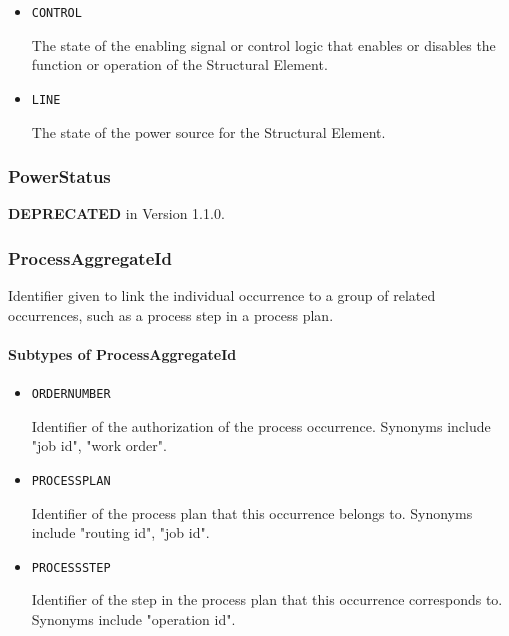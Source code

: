 \begin{itemize}

\item \texttt{CONTROL}


The state of the enabling signal or control logic that enables or disables the function or operation of the \gls{Structural Element}.

\item \texttt{LINE}


The state of the power source for the \gls{Structural Element}.


\end{itemize}

\subsubsection{PowerStatus}
\label{sec:PowerStatus}



\textbf{DEPRECATED} in Version 1.1.0.


\subsubsection{ProcessAggregateId}
\label{sec:ProcessAggregateId}



Identifier given to link the individual occurrence to a group of related occurrences, such as a process step in a process plan.


\paragraph{Subtypes of ProcessAggregateId}\mbox{}
\label{sec:Subtypes of ProcessAggregateId}

\begin{itemize}

\item \texttt{ORDER\textunderscore NUMBER}


Identifier of the authorization of the process occurrence. Synonyms include "job id", "work order".

\item \texttt{PROCESS\textunderscore PLAN}


Identifier of the process plan that this occurrence belongs to. Synonyms include "routing id", "job id".


\item \texttt{PROCESS\textunderscore STEP}


Identifier of the step in the process plan that this occurrence corresponds to. Synonyms include "operation id".


\end{itemize}


